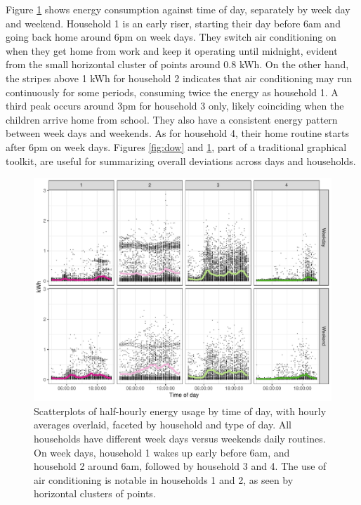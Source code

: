 \documentclass[12pt]{article}
\begin{document}
Figure \ref{fig:hod} shows energy consumption against time of day, separately by week day and weekend. Household 1 is an early riser, starting their day before 6am and going back home around 6pm on week days. They switch air conditioning on when they get home from work and keep it operating until midnight, evident from the small horizontal cluster of points around 0.8 kWh. On the other hand, the stripes above 1 kWh for household 2 indicates that air conditioning may run continuously for some periods, consuming twice the energy as household 1. A third peak occurs around 3pm for household 3 only, likely coinciding when the children arrive home from school. They also have a consistent energy pattern between week days and weekends. As for household 4, their home routine starts after 6pm on week days. Figures \ref{fig:dow} and \ref{fig:hod}, part of a traditional graphical toolkit, are useful for summarizing overall deviations across days and households.

\begin{figure}

{\centering \includegraphics[width=\textwidth]{figure/hod-1} 

}

\caption{Scatterplots of half-hourly energy usage by time of day, with hourly averages overlaid, faceted by household and type of day. All households have different week days versus weekends daily routines. On week days, household 1 wakes up early before 6am, and household 2 around 6am, followed by household 3 and 4. The use of air conditioning is notable in households 1 and 2, as seen by horizontal clusters of points.}\label{fig:hod}
\end{figure}
\end{document}
